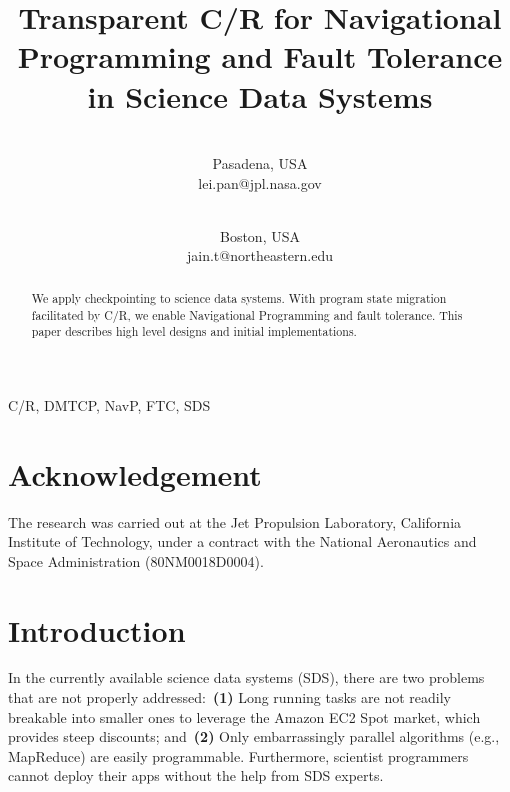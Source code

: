 \documentclass[conference]{IEEEtran}
\begin{document}
\title{Transparent C/R for Navigational Programming and Fault Tolerance in Science Data Systems}


\author{
 \\
Pasadena, USA\\
lei.pan@jpl.nasa.gov\\
\and
{}
 \\
Boston, USA\\
jain.t@northeastern.edu}

\maketitle

\begin{abstract}
We apply checkpointing to science data systems. With program state migration facilitated by C/R, we enable Navigational Programming and fault tolerance. This paper describes high level designs and initial implementations.
\end{abstract}

\begin{IEEEkeywords}
C/R, DMTCP, NavP, FTC, SDS
\end{IEEEkeywords}
\vspace{-2.2mm}

\section*{Acknowledgement}
The research was carried out at the Jet Propulsion Laboratory, California Institute of Technology, under a contract with the National Aeronautics and Space Administration (80NM0018D0004).

\section{Introduction}
\label{sec:introduction}
In the currently available science data systems (SDS), there are two problems that are not properly addressed:~\textbf{(1)} Long running tasks are not readily breakable into smaller ones to leverage the Amazon EC2 Spot market, which provides steep discounts; and~\textbf{(2)} Only embarrassingly parallel algorithms (e.g., MapReduce) are easily programmable. Furthermore, scientist programmers cannot deploy their apps without the help from SDS experts.
\end{document}
